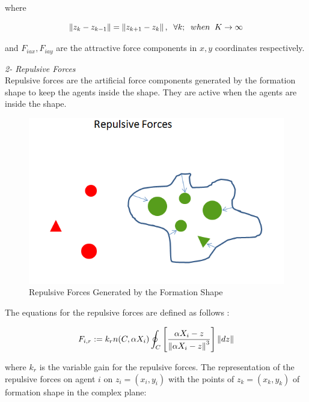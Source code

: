 where

\begin{equation}
\left\lVert z_k - z_{k-1}\right\rVert = \left\lVert z_{k+1} - z_k\right\rVert, \hspace{0.2cm}  \forall k ;  \hspace{0.2cm} when  \hspace{0.2cm} K \to\infty
\end{equation}
			
and $F_{iax} , F_{iay} $ are the attractive force components in $x,y$ coordinates respectively.\newline
			
\textit{	2- Repulsive Forces} \\ 
Repulsive forces are the artificial force components generated by the formation shape to keep the agents inside the shape. They are active when the agents are inside the shape. 
					
\begin{figure}[H]
\caption{Repulsive Forces Generated by the Formation Shape}
\centering
\includegraphics[scale = 0.60]{repulsive_forces}
\end{figure}
							
The equations for the repulsive forces are defined as follows \cite{17}:	

\begin{equation}
F_{i,r} := k_r  n(C,\alpha X_i) \oint_C \left[\frac{\alpha X_i - z}{\left\lVert\alpha X_i - z\right\rVert^3}\right] \left\lVert dz\right\rVert
\end{equation}

where $k_r$ is the variable gain for the repulsive forces. The representation of the repulsive forces on agent $i$ on $z_i = (x_i, y_i)$ with the points of  $z_k = (x_k,y_k)$ of formation shape in the complex plane:

